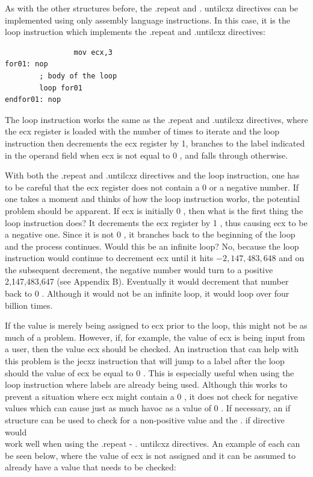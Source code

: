 \documentclass[10pt]{article}
\begin{document}
As with the other structures before, the .repeat and . untilcxz directives can be implemented using only assembly language instructions. In this case, it is the loop instruction which implements the .repeat and .untilcxz directives:

\begin{verbatim}
                mov ecx,3
for01: nop
        ; body of the loop
        loop for01
endfor01: nop
\end{verbatim}

The loop instruction works the same as the .repeat and .untilcxz directives, where the ecx register is loaded with the number of times to iterate and the loop instruction then decrements the ecx register by 1, branches to the label indicated in the operand field when ecx is not equal to 0 , and falls through otherwise.

With both the .repeat and .untilcxz directives and the loop instruction, one has to be careful that the ecx register does not contain a 0 or a negative number. If one takes a moment and thinks of how the loop instruction works, the potential problem should be apparent. If ecx is initially 0 , then what is the first thing the loop instruction does? It decrements the ecx register by 1 , thus causing ecx to be a negative one. Since it is not 0 , it branches back to the beginning of the loop and the process continues. Would this be an infinite loop? No, because the loop instruction would continue to decrement ecx until it hits $-2,147,483,648$ and on the subsequent decrement, the negative number would turn to a positive 2,147,483,647 (see Appendix B). Eventually it would decrement that number back to 0 . Although it would not be an infinite loop, it would loop over four billion times.

If the value is merely being assigned to ecx prior to the loop, this might not be as much of a problem. However, if, for example, the value of ecx is being input from a user, then the value ecx should be checked. An instruction that can help with this problem is the jecxz instruction that will jump to a label after the loop should the value of ecx be equal to 0 . This is especially useful when using the loop instruction where labels are already being used. Although this works to prevent a situation where ecx might contain a 0 , it does not check for negative values which can cause just as much havoc as a value of 0 . If necessary, an if structure can be used to check for a non-positive value and the . if directive would\\
work well when using the .repeat - . untilcxz directives. An example of each can be seen below, where the value of ecx is not assigned and it can be assumed to already have a value that needs to be checked:
\end{document}
